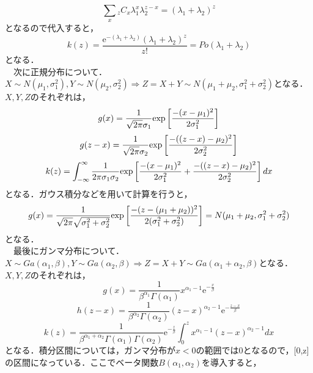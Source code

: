 \documentclass[autodetect-engine,dvipdfmx-if-dvi,ja=standard,a4paper,11pt]{bxjsarticle} %
\begin{document}
\begin{itemize}
\begin{equation}
\displaystyle\sum_{x}{}_{z} C_x\lambda_1^x\lambda_2^{z-x}=(\lambda_1+\lambda_2)^z
\end{equation}
となるので代入すると，
\begin{equation}
k(z)=\frac{\mathrm{e}^{-(\lambda_1+\lambda_2)}(\lambda_1+\lambda_2)^z}{z!}=Po(\lambda_1+\lambda_2)
\end{equation}
となる．\\
　次に正規分布について．$X\sim N(\mu_1,\sigma_1^2),Y\sim N(\mu_2,\sigma_2^2)\Rightarrow Z=X+Y\sim N(\mu_1+\mu_2,\sigma_1^2+\sigma_2^2)$となる．$X,Y,Z$のそれぞれは，
\begin{equation}
g(x)=\frac{1}{\sqrt{2\pi}\sigma_1}{\rm exp}\left[\frac{-(x-\mu_1)^2}{2\sigma_1^2}\right]
\end{equation}
\begin{equation}
g(z-x)=\frac{1}{\sqrt{2\pi}\sigma_2}{\rm exp}\left[\frac{-((z-x)-\mu_2)^2}{2\sigma_2^2}\right]
\end{equation}
\begin{equation}
\label{N_z}
k(z)=\displaystyle\int_{-\infty}^{\infty}\frac{1}{2\pi\sigma_1\sigma_2}{\rm exp}\left[\frac{-(x-\mu_1)^2}{2\sigma_1^2}+\frac{-((z-x)-\mu_2)^2}{2\sigma_2^2}\right]dx
\end{equation}
となる．ガウス積分などを用いて計算を行うと，
\begin{equation}
g(x)=\frac{1}{\sqrt{2\pi}\sqrt{\sigma_1^2+\sigma_2^2}}{\rm exp}\left[\frac{-(z-(\mu_1+\mu_2))^2}{2(\sigma_1^2+\sigma_2^2)}\right]=N(\mu_1+\mu_2,\sigma_1^2+\sigma_2^2)
\end{equation} 
となる．\\
　最後にガンマ分布について．$X\sim Ga(\alpha_1,\beta),Y\sim Ga(\alpha_2,\beta)\Rightarrow Z=X+Y\sim Ga(\alpha_1+\alpha_2,\beta)$となる．$X,Y,Z$のそれぞれは，
\begin{equation}
g(x)=\frac{1}{\beta^{\alpha_1}\Gamma(\alpha_1)}x^{\alpha_1-1}\mathrm{e}^{-\frac{x}{\beta}}
\end{equation}
\begin{equation}
h(z-x)=\frac{1}{\beta^{\alpha_2}\Gamma(\alpha_2)}(z-x)^{\alpha_2-1}\mathrm{e}^{-\frac{z-x}{\beta}}
\end{equation}
\begin{equation}
\label{Ga_z}
k(z)=\frac{1}{\beta^{\alpha_1+\alpha_2}\Gamma(\alpha_1)\Gamma(\alpha_2)}\mathrm{e}^{-\frac{z}{\beta}}\displaystyle\int_{0}^{z}x^{\alpha_1-1}(z-x)^{\alpha_2-1}dx
\end{equation}
となる．積分区間については，ガンマ分布が$x<0$の範囲では$0$となるので，[0,z]の区間になっている．ここでベータ関数$B(\alpha_1,\alpha_2)$を導入すると，

\end{itemize}
\end{document}
